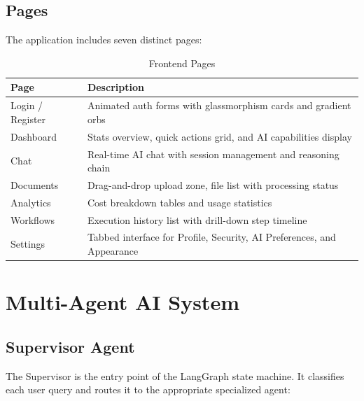 \documentclass[12pt, a4paper]{report}
\begin{document}
\section{Pages}

The application includes seven distinct pages:

\begin{table}[H]
\centering
\caption{Frontend Pages}
\label{tab:pages}
\begin{tabularx}{\textwidth}{l|X}
\toprule
\textbf{Page} & \textbf{Description} \\
\midrule
Login / Register & Animated auth forms with glassmorphism cards and gradient orbs \\
Dashboard        & Stats overview, quick actions grid, and AI capabilities display \\
Chat             & Real-time AI chat with session management and reasoning chain \\
Documents        & Drag-and-drop upload zone, file list with processing status \\
Analytics        & Cost breakdown tables and usage statistics \\
Workflows        & Execution history list with drill-down step timeline \\
Settings         & Tabbed interface for Profile, Security, AI Preferences, and Appearance \\
\bottomrule
\end{tabularx}
\end{table}

\chapter{Multi-Agent AI System}

\section{Supervisor Agent}

The Supervisor is the entry point of the LangGraph state machine. It classifies each user query and routes it to the appropriate specialized agent:
\end{document}
